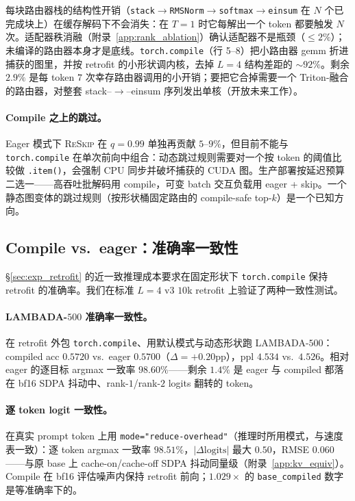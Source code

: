 \documentclass{article}
\newcommand{\reskip}{\textsc{ReSkip}}
\begin{document}
每块路由器栈的结构性开销（\texttt{stack}$\to$\texttt{RMSNorm}$\to$\texttt{softmax}$\to$\texttt{einsum} 在 $N$ 个已完成块上）在缓存解码下不会消失：在 $T{=}1$ 时它每解出一个 token 都要触发 $N$ 次。适配器秩消融（附录~\ref{app:rank_ablation}）确认适配器不是瓶颈（$\leq 2\%$）；未编译的路由器本身才是底线。\texttt{torch.compile}（行 5--8）把小路由器 gemm 折进捕获的图里，并按 retrofit 的小形状调内核，去掉 $L{=}4$ 结构差距的 $\sim$$92\%$。剩余 $2.9\%$ 是每 token $7$ 次幸存路由器调用的小开销；要把它合掉需要一个 Triton-融合的路由器，对整套 stack--$\to$--einsum 序列发出单核（开放未来工作）。

\paragraph{Compile 之上的跳过。} Eager 模式下 \reskip{} 在 $q{=}0.99$ 单独再贡献 $5$--$9\%$，但目前不能与 \texttt{torch.compile} 在单次前向中组合：动态跳过规则需要对一个按 token 的阈值比较做 \texttt{.item()}，会强制 CPU 同步并破坏捕获的 CUDA 图。生产部署按延迟预算二选一——高吞吐批解码用 compile，可变 batch 交互负载用 eager + skip。一个静态图变体的跳过规则（按形状桶固定路由的 compile-safe top-$k$）是一个已知方向。

\subsection{Compile vs.\ eager：准确率一致性}
\label{app:compile_accuracy}

\S\ref{sec:exp_retrofit} 的近一致推理成本要求在固定形状下 \texttt{torch.compile} 保持 retrofit 的准确率。我们在标准 $L{=}4$ v3 $10$k retrofit 上验证了两种一致性测试。

\paragraph{LAMBADA-$500$ 准确率一致性。} 在 retrofit 外包 \texttt{torch.compile}、用默认模式与动态形状跑 LAMBADA-$500$：compiled acc $0.5720$ vs.\ eager $0.5700$（$\Delta{=}+0.20$pp），ppl $4.534$ vs.\ $4.526$。相对 eager 的逐目标 argmax 一致率 $98.60\%$——剩余 $1.4\%$ 是 eager 与 compiled 都落在 bf16 SDPA 抖动中、rank-$1$/rank-$2$ logits 翻转的 token。

\paragraph{逐 token logit 一致性。} 在真实 prompt token 上用 \texttt{mode="reduce-overhead"}（推理时所用模式，与速度表一致）：逐 token argmax 一致率 $98.51\%$，$|\Delta\text{logits}|$ 最大 $0.50$，RMSE $0.060$——与原 base 上 cache-on/cache-off SDPA 抖动同量级（附录~\ref{app:kv_equiv}）。Compile 在 bf16 评估噪声内保持 retrofit 前向；$1.029\times$ 的 \texttt{base\_compiled} 数字是等准确率下的。
\end{document}
